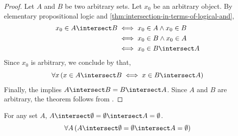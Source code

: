 \begin{proof}
    Let \( A \) and \( B \) be two arbitrary sets. Let \( x_{0} \) be an arbitrary object.
    By elementary propositional logic and \cref{thm:intersection-in-terms-of-logical-and},
    \begin{align*}
        x_{0} \in A \intersect B
        &\iff
        x_{0} \in A \land x_{0} \in B \\
        &\iff
        x_{0} \in B \land x_{0} \in A \\
        &\iff
        x_{0} \in B \intersect A
    \end{align*}
    Since \( x_{0} \) is arbitrary, we conclude by  that,
    \begin{equation*}
        \forall x \, \mleft( x \in A \intersect B \iff x \in B \intersect A \mright)
    \end{equation*}
    Finally, the  implies \( A \intersect B = B \intersect A \).
    Since \( A \) and \( B \) are arbitrary, the theorem follows from .
\end{proof}

\begin{thm}[Absorption]
    \label{set-identities:intersection-of-any-set-with-empty-set-is-always-empty}
    For any set \( A \), \( A \intersect \emptyset = \emptyset \intersect A = \emptyset \).
    \begin{equation*}
        \forall A \, \mleft( A \intersect \emptyset = \emptyset \intersect A = \emptyset \mright)
    \end{equation*}
\end{thm}

